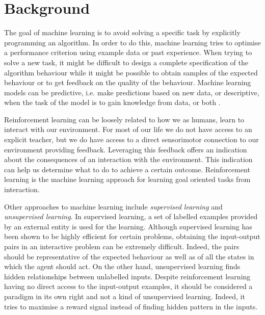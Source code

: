 \chapter{Background}
\label{chap:background}	

The goal of machine learning is to avoid solving a specific task by explicitly programming an algorithm. In order to do this, machine learning tries to optimise a performance criterion using example data or past experience. When trying to solve a new task, it might be difficult to design a complete specification of the algorithm behaviour while it might be possible to obtain samples of the expected behaviour or to get feedback on the quality of the behaviour. Machine learning models can be predictive, i.e. make predictions based on new data, or descriptive, when the task of the model is to gain knowledge from data, or both \cite{alpaydin_introduction_2010}.

Reinforcement learning can be loosely related to how we as humans, learn to interact with our environment. For most of our life we do not have access to an explicit teacher, but we do have access to a direct sensorimotor connection to our environment providing feedback. Leveraging this feedback offers an indication about the consequences of an interaction with the environment. This indication can help us determine what to do to achieve a certain outcome. Reinforcement learning is the machine learning approach for learning goal oriented tasks from interaction.

Other approaches to machine learning include \textit{supervised learning} and \textit{unsupervised learning}. In supervised learning, a set of labelled examples provided by an external entity is used for the learning. Although supervised learning has been shown to be highly efficient for certain problems, obtaining the input-output pairs in an interactive problem can be extremely difficult. Indeed, the pairs should be representative of the expected behaviour as well as of all the states in which the agent should act. On the other hand, unsupervised learning finds hidden relationships between unlabelled inputs. Despite reinforcement learning having no direct access to the input-output examples, it should be considered a paradigm in its own right and not a kind of unsupervised learning. Indeed, it tries to maximise a reward signal instead of finding hidden pattern in the inputs.


